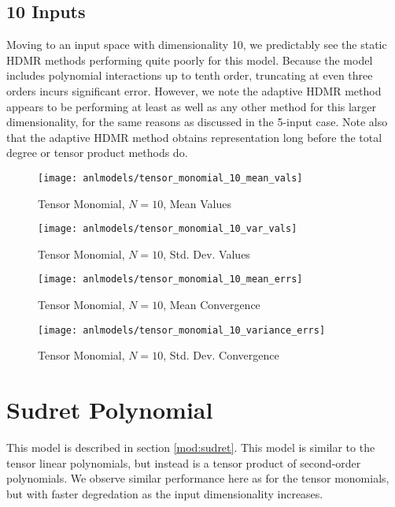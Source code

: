 \subsection{10 Inputs}
Moving to an input space with dimensionality 10, we predictably see the static HDMR methods performing quite
poorly for this model.  Because the model includes polynomial interactions up to tenth order, truncating at
even three orders incurs significant error.  However, we note the adaptive HDMR method appears to be
performing at least as well as any other method for this larger dimensionality, for the same reasons as
discussed in the 5-input case.  Note also that the adaptive HDMR method obtains representation long before the
total degree or tensor product methods do.
\begin{figure}[H]
  \centering
  \texttt{[image: anlmodels/tensor\_monomial\_10\_mean\_vals]}
  \caption{Tensor Monomial, $N=10$, Mean Values}
  \label{fig:tensormono mean values 10}
\end{figure}
\begin{figure}[H]
  \centering
  \texttt{[image: anlmodels/tensor\_monomial\_10\_var\_vals]}
  \caption{Tensor Monomial, $N=10$, Std. Dev. Values}
  \label{fig:tensormono var values 10}
\end{figure}

\begin{figure}[H]
  \centering
  \texttt{[image: anlmodels/tensor\_monomial\_10\_mean\_errs]}
  \caption{Tensor Monomial, $N=10$, Mean Convergence}
  \label{fig:tensormono mean errors 10}
\end{figure}
\begin{figure}[H]
  \centering
  \texttt{[image: anlmodels/tensor\_monomial\_10\_variance\_errs]}
  \caption{Tensor Monomial, $N=10$, Std. Dev. Convergence}
  \label{fig:tensormono var errors 10}
\end{figure}


\section{Sudret Polynomial}
This model is described in section \ref{mod:sudret}.  This model is similar to the tensor linear polynomials,
but instead is a tensor product of second-order polynomials.  We observe similar performance here as for the
tensor monomials, but with faster degredation as the input dimensionality increases.

